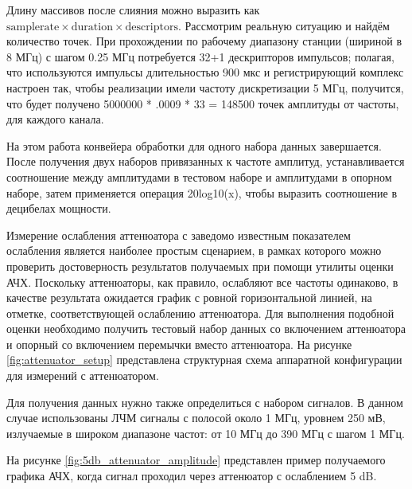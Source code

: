 \documentclass{report}
\begin{document}
Длину массивов после слияния можно выразить как $\text{samplerate} \times \text{duration} \times \text{descriptors}$. Рассмотрим реальную ситуацию и найдём количество точек. При прохождении по рабочему диапазону станции (шириной в 8 МГц) с шагом 0.25 МГц потребуется 32+1 дескрипторов импульсов; полагая, что используются импульсы  длительностью 900 мкс и регистрирующий комплекс настроен так, чтобы реализации имели частоту дискретизации 5 МГц, получится, что будет получено 5000000 * .0009 * 33 = 148500 точек амплитуды от частоты, для каждого канала.

На этом работа конвейера обработки для одного набора данных завершается. После получения двух наборов привязанных к частоте амплитуд, устанавливается соотношение между амплитудами в тестовом наборе и амплитудами в опорном наборе, затем применяется операция 20log10(x), чтобы выразить соотношение в децибелах мощности.

Измерение ослабления аттенюатора с заведомо известным показателем ослабления является наиболее простым сценарием, в рамках которого можно проверить достоверность результатов получаемых при помощи утилиты оценки АЧХ. Поскольку аттенюаторы, как правило, ослабляют все частоты одинаково, в качестве результата ожидается график с ровной горизонтальной линией, на отметке, соответствующей ослаблению аттенюатора. Для выполнения подобной оценки необходимо получить тестовый набор данных со включением аттенюатора и опорный со включением перемычки вместо аттенюатора. На рисунке \ref{fig:attenuator_setup} представлена структурная схема аппаратной конфигурации для измерений с аттенюатором.


Для получения данных нужно также определиться с набором сигналов. В данном случае использованы ЛЧМ сигналы с полосой около 1 МГц, уровнем 250 мВ, излучаемые в широком диапазоне частот: от 10 МГц до 390 МГц с шагом 1 МГц.

На рисунке \ref{fig:5db_attenuator_amplitude} представлен пример получаемого графика АЧХ, когда сигнал проходил через аттенюатор с ослаблением 5 dB.

\end{document}
